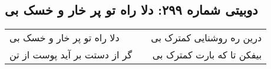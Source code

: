 \begin{center}
\section*{دوبیتی شماره ۲۹۹: دلا راه تو پر خار و خسک بی}
\label{sec:299}
\begin{longtable}{l p{0.5cm} r}
دلا راه تو پر خار و خسک بی
&&
درین ره روشنایی کمترک بی
\\
گر از دستت بر آید پوست از تن
&&
بیفکن تا که بارت کمترک بی
\\
\end{longtable}
\end{center}
